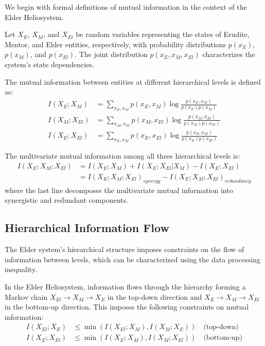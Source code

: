 We begin with formal definitions of mutual information in the context of the Elder Heliosystem.

\begin{definition}
Let $X_E$, $X_M$, and $X_{El}$ be random variables representing the states of Erudite, Mentor, and Elder entities, respectively, with probability distributions $p(x_E)$, $p(x_M)$, and $p(x_{El})$. The joint distribution $p(x_E, x_M, x_{El})$ characterizes the system's state dependencies.
\end{definition}

\begin{definition}
The mutual information between entities at different hierarchical levels is defined as:
\begin{align}
I(X_E; X_M) &= \sum_{x_E, x_M} p(x_E, x_M) \log \frac{p(x_E, x_M)}{p(x_E)p(x_M)} \\
I(X_M; X_{El}) &= \sum_{x_M, x_{El}} p(x_M, x_{El}) \log \frac{p(x_M, x_{El})}{p(x_M)p(x_{El})} \\
I(X_E; X_{El}) &= \sum_{x_E, x_{El}} p(x_E, x_{El}) \log \frac{p(x_E, x_{El})}{p(x_E)p(x_{El})}
\end{align}
\end{definition}

\begin{definition}
The multivariate mutual information among all three hierarchical levels is:
\begin{align}
I(X_E; X_M; X_{El}) &= I(X_E; X_M) + I(X_E; X_{El}|X_M) - I(X_E; X_{El}) \\
&= I(X_E; X_M; X_{El})_{synergy} - I(X_E; X_M; X_{El})_{redundancy}
\end{align}
where the last line decomposes the multivariate mutual information into synergistic and redundant components.
\end{definition}

\subsection{Hierarchical Information Flow}

The Elder system's hierarchical structure imposes constraints on the flow of information between levels, which can be characterized using the data processing inequality.

\begin{theorem}
In the Elder Heliosystem, information flows through the hierarchy forming a Markov chain $X_{El} \rightarrow X_M \rightarrow X_E$ in the top-down direction and $X_E \rightarrow X_M \rightarrow X_{El}$ in the bottom-up direction. This imposes the following constraints on mutual information:
\begin{align}
I(X_{El}; X_E) &\leq \min(I(X_{El}; X_M), I(X_M; X_E)) \quad \text{(top-down)}\\
I(X_E; X_{El}) &\leq \min(I(X_E; X_M), I(X_M; X_{El})) \quad \text{(bottom-up)}
\end{align}
\end{theorem}

